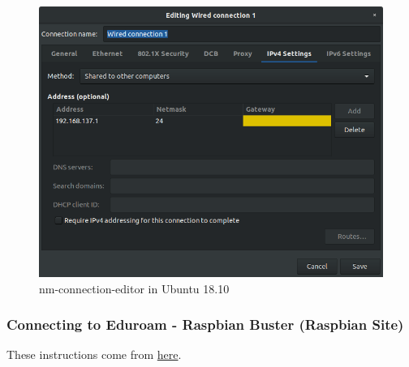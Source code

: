 \begin{figure}[H]
\centering
\includegraphics[width=0.6\columnwidth]{Figures/nm-connection-editor}
\caption{nm-connection-editor in Ubuntu 18.10}
\label{fig:nm-connection-editor}
\end{figure}


\subsubsection{Connecting to Eduroam - Raspbian Buster (Raspbian Site)}
These instructions come from \href{https://www.raspberrypi.org/forums/viewtopic.php?p=1501822#p1501822}{here}.\\

